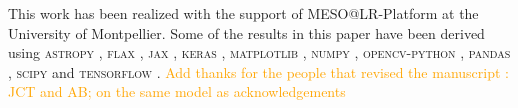 \documentclass[amt, article]{copernicus}
\begin{document}


\begin{acknowledgements}
This work has been realized with the support of MESO@LR-Platform at the University of Montpellier. Some of the results in this paper have been derived using \textsc{astropy} \citep{Astropy2013, Astropy2018}, \textsc{flax} \citep{Flax}, \textsc{jax} \citep{Jax}, \textsc{keras} \citep{Keras}, \textsc{matplotlib} \citep{Matplotlib}, \textsc{numpy} \citep{Numpy}, \textsc{opencv-python} \citep{opencv-python}, \textsc{pandas} \citep{Pandas}, \textsc{scipy} \citep{scipy} and \textsc{tensorflow} \citep{TensorFlow}. \textcolor{orange}{Add thanks for the people that revised the manuscript : JCT and AB; on the same model as \citet{stardice1} acknowledgements}
\end{acknowledgements}











\end{document}
